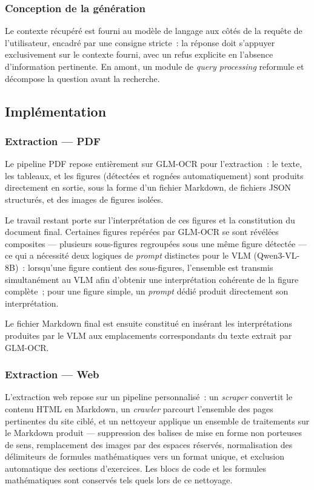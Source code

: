 \documentclass[11pt,a4paper]{article}
\begin{document}
\subsubsection{Conception de la génération}

Le contexte récupéré est fourni au modèle de langage aux côtés de la requête de l'utilisateur, encadré par une consigne stricte~: la réponse doit s'appuyer exclusivement sur le contexte fourni, avec un refus explicite en l'absence d'information pertinente. En amont, un module de \textit{query processing} reformule et décompose la question avant la recherche.

\subsection{Implémentation}

\subsubsection{Extraction --- PDF}

Le pipeline PDF repose entièrement sur GLM-OCR pour l'extraction~: le texte, les tableaux, et les figures (détectées et rognées automatiquement) sont produits directement en sortie, sous la forme d'un fichier Markdown, de fichiers JSON structurés, et des images de figures isolées.

Le travail restant porte sur l'interprétation de ces figures et la constitution du document final. Certaines figures repérées par GLM-OCR se sont révélées composites --- plusieurs sous-figures regroupées sous une même figure détectée --- ce qui a nécessité deux logiques de \textit{prompt} distinctes pour le VLM (Qwen3-VL-8B)~: lorsqu'une figure contient des sous-figures, l'ensemble est transmis simultanément au VLM afin d'obtenir une interprétation cohérente de la figure complète~; pour une figure simple, un \textit{prompt} dédié produit directement son interprétation.

Le fichier Markdown final est ensuite constitué en insérant les interprétations produites par le VLM aux emplacements correspondants du texte extrait par GLM-OCR.

\subsubsection{Extraction --- Web}

L'extraction web repose sur un pipeline personnalisé~: un \textit{scraper} convertit le contenu HTML en Markdown, un \textit{crawler} parcourt l'ensemble des pages pertinentes du site ciblé, et un nettoyeur applique un ensemble de traitements sur le Markdown produit --- suppression des balises de mise en forme non porteuses de sens, remplacement des images par des espaces réservés, normalisation des délimiteurs de formules mathématiques vers un format unique, et exclusion automatique des sections d'exercices. Les blocs de code et les formules mathématiques sont conservés tels quels lors de ce nettoyage.
\end{document}

